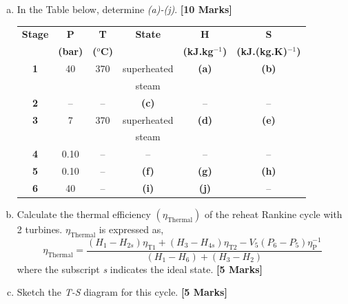 \documentclass[calculator,steamtables,refrigeranttables,psychrometricchart,datasheet,sample]{exam}
\newcommand{\frc}{\displaystyle\frac}
\begin{document}
\begin{question}
\begin{enumerate}[(a)]
\item In the Table below, determine {\it (a)-(j)}. {\bf [10 Marks]}\\
\begin{center}
\begin{tabular} {||c | c c c c c || }
\hline\hline
{\bf Stage} & {\bf P}    & {\bf T}        & {\bf State}    & {\bf H}             & {\bf S}                  \\
            & {\bf (bar)}& {\bf ($^{o}$C)} &               & {\bf (kJ.kg$^{-1}$)} & {\bf (kJ.(kg.K)$^{-1}$)} \\
\hline\hline
 {\bf 1 }   & 40         & 370            &   superheated  & {\bf (a)}           & {\bf (b)}                 \\
            &            &                &   steam        &                     &                           \\
 {\bf 2 }   &  --        &  --            &     {\bf (c)}  & --                  &   --                      \\
 {\bf 3 }   & 7          & 370            &   superheated  & {\bf (d)}           & {\bf (e)}                 \\
            &            &                &   steam        &                     &                           \\
 {\bf 4 }   & 0.10       & --             &     --         & --                   & --                      \\
 {\bf 5 }   & 0.10       & --             &   {\bf (f)}    & {\bf (g)}           & {\bf (h)}                 \\
 {\bf 6 }   & 40         & --             &   {\bf (i)}    & {\bf (j)}           & --                       \\

\hline\hline
\end{tabular}
\end{center}


\item Calculate the thermal efficiency $\left(\eta_{\text{Thermal}}\right)$ of the reheat Rankine cycle with 2 turbines. $\eta_{\text{Thermal}}$ is expressed as, 
\begin{displaymath}
\eta_{\text{Thermal}} = \frc{ \left(H_{1}-H_{2s}\right)\eta_{\text{T1}} + \left(H_{3}-H_{4s}\right)\eta_{\text{T2}} - V_{5}\left(P_{6}-P_{5}\right)\eta_{\text{P}}^{-1}} {\left(H_{1}-H_{6}\right)+\left(H_{3}-H_{2}\right)}
\end{displaymath}
where the subscript {\it s} indicates the ideal state. {\bf [5 Marks]}

\item Sketch the {\it T-S} diagram for this cycle. {\bf [5 Marks]}

\end{enumerate}

\end{question}

\clearpage

{




}


\vfill

\paperend
\end{document}
